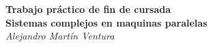 \documentclass[12pt, a4paper,english,spanish]{amsart}
\begin{document}
\makeatletter
\preto{\@verbatim}{\topsep=0pt \partopsep=0pt }
\makeatother

\begin{center}
~\\
~\\
~\\
~\\
~\\
~\\
~\\
~\\
~\\
~\\
~\\
~\\
   \Large\textbf{Trabajo práctico de fin de cursada}\\
   \Large\textbf{Sistemas complejos en maquinas paralelas}\\
   \large\textit{Alejandro Martín Ventura}\\
\end{center}
\newpage


\newpage



\newpage

\newpage


\end{document}
